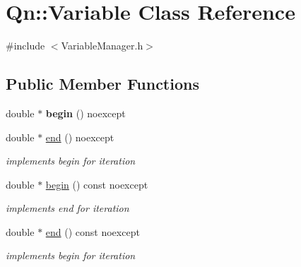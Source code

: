 \hypertarget{classQn_1_1Variable}{}\section{Qn\+:\+:Variable Class Reference}
\label{classQn_1_1Variable}


{\ttfamily \#include $<$Variable\+Manager.\+h$>$}

\subsection*{Public Member Functions}
\begin{DoxyCompactItemize}
\item 
\mbox{\label{classQn_1_1Variable_a40aa125be4ab08ed7213870b516b6813}} 
double $\ast$ {\bfseries begin} () noexcept
\item 
\mbox{\label{classQn_1_1Variable_ae61ed054dea91c08bef5078787f4fdfb}} 
double $\ast$ \mbox{\hyperlink{classQn_1_1Variable_ae61ed054dea91c08bef5078787f4fdfb}{end}} () noexcept
\begin{DoxyCompactList}\small\item\em implements begin for iteration \end{DoxyCompactList}\item 
\mbox{\label{classQn_1_1Variable_a3f397d1e9bc96762d1b8bee00be49b46}} 
double $\ast$ \mbox{\hyperlink{classQn_1_1Variable_a3f397d1e9bc96762d1b8bee00be49b46}{begin}} () const noexcept
\begin{DoxyCompactList}\small\item\em implements end for iteration \end{DoxyCompactList}\item 
\mbox{\label{classQn_1_1Variable_aef018b9a2a1ad92fd6ea4978e448cfbc}} 
double $\ast$ \mbox{\hyperlink{classQn_1_1Variable_aef018b9a2a1ad92fd6ea4978e448cfbc}{end}} () const noexcept
\begin{DoxyCompactList}\small\item\em implements begin for iteration \end{DoxyCompactList}\item 
\mbox{\label{classQn_1_1Variable_a3d5eafe37996f2b184cec7de2826195b}} 

\end{DoxyCompactItemize}
